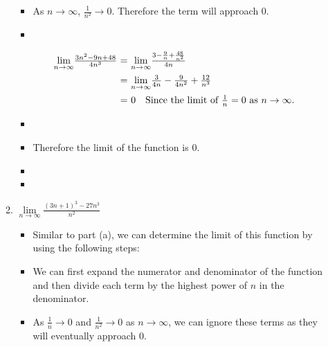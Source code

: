 \documentclass[12pt]{report}
\begin{document}
\begin{enumerate}[leftmargin=\labelsep]
\begin{enumerate}
\begin{tcolorbox}
\begin{itemize}[label={}]
                        \item As $n \rightarrow \infty$, $\frac{1}{n^2} \rightarrow 0$. Therefore the term will approach 0.
                        \item 
                    \end{itemize}
                    \begin{equation*}
                        \begin{array}{r@{~=~}l}
                            {\lim \limits_{{n\rightarrow \infty}}} \frac{3n^2-9n + 48}{4n^3} & {\lim \limits_{{n\rightarrow \infty}}} \frac{3-\frac{9}{n} + \frac{48}{n^2}}{4n} \\ [2ex]
                            & {\lim \limits_{{n\rightarrow \infty}}} \frac{3}{4n} - \frac{9}{4n^2} + \frac{12}{n^3} \\ [2ex]
                            & 0 \quad \text{Since the limit of } \frac{1}{n} = 0 \text{ as } n \rightarrow \infty.
                        \end{array}
                    \end{equation*}
                    \begin{itemize}[label={}]
                        \item
                        \item Therefore the limit of the function is 0.
                        \item \item
                    \end{itemize}
                \end{tcolorbox}
            \item $\lim \limits_{n\rightarrow \infty} \frac{(3n+1)^3-27n^3}{n^2}$
                \begin{tcolorbox}
                    \begin{itemize}[label={}]
                        \item Similar to part (a), we can determine the limit of this function by using the following steps:
                        \item We can first expand the numerator and denominator of the function and then divide each term by the highest power of $n$ in the denominator.
                        \item As $\frac{1}{n} \rightarrow 0$ and $\frac{1}{n^2} \rightarrow 0$ as $n \rightarrow \infty$, we can ignore these terms as they will eventually approach 0.
                    \end{itemize}

\end{tcolorbox}
\end{enumerate}
\end{enumerate}
\end{document}
